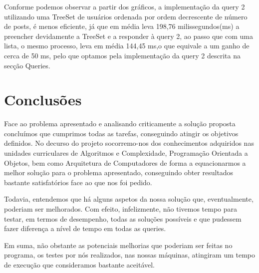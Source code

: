 \documentclass[a4paper]{article}
\begin{document}
    \vspace{0.4cm}

Conforme podemos observar a partir dos gráficos, a implementação da query 2 utilizando
uma TreeSet de usuários ordenada por ordem decrescente de número de posts,
é menos eficiente, já que em média leva 198,76 milissegundos(ms) a preencher
devidamente a TreeSet e a responder à query 2, ao passo que com uma lista,
o mesmo processo, leva em média 144,45 ms,o que equivale a um ganho de cerca de
50 ms, pelo que optamos pela implementação da query 2 descrita na secção Queries.

\section{Conclusões}
\label{sec:conclusao}

Face ao problema apresentado e analisando criticamente a solução proposta concluímos
que cumprimos todas as tarefas, conseguindo atingir os objetivos definidos. No decurso
do projeto socorremo-nos dos conhecimentos adquiridos nas unidades curriculares de
Algoritmos e Complexidade, Programação Orientada a Objetos, bem como Arquitetura de Computadores
de forma a equacionarmos a melhor solução para o problema apresentado, conseguindo
obter resultados bastante satisfatórios face ao que nos foi pedido. \par
Todavia, entendemos que há alguns aspetos da nossa solução que, eventualmente,
poderiam ser melhorados. Com efeito, infelizmente, não tivemos tempo para testar,
em termos de desempenho, todas as soluções possíveis e que pudessem fazer diferença
a nível de tempo em todas as queries.\par
Em suma, não obstante as potenciais melhorias que poderiam ser feitas no
programa, os testes por nós realizados, nas nossas máquinas, atingiram
um tempo de execução que consideramos bastante aceitável.
\end{document}
